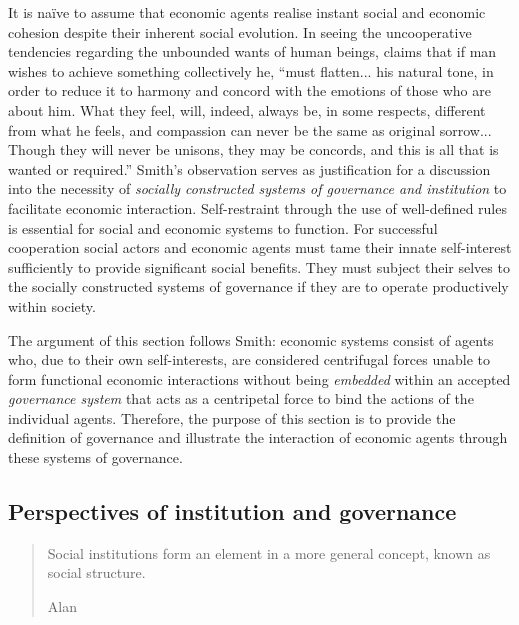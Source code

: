 It is na\"{i}ve to assume that economic agents realise instant social and economic cohesion despite their inherent social evolution. In seeing the uncooperative tendencies regarding the unbounded wants of human beings, \citet[p.~17]{Smith1759} claims that if man wishes to achieve something collectively he, ``must flatten... his natural tone, in order to reduce it to harmony and concord with the emotions of those who are about him. What they feel, will, indeed, always be, in some respects, different from what he feels, and compassion can never be the same as original sorrow... Though they will never be unisons, they may be concords, and this is all that is wanted or required.'' Smith's observation serves as justification for a discussion into the necessity of \emph{socially constructed systems of governance and institution} to facilitate economic interaction. Self-restraint through the use of well-defined rules is essential for social and economic systems to function. For successful cooperation social actors and economic agents must tame their innate self-interest sufficiently to provide significant social benefits. They must subject their selves to the socially constructed systems of governance if they are to operate productively within society.

The argument of this section follows Smith: economic systems consist of agents who, due to their own self-interests, are considered centrifugal forces unable to form functional economic interactions without being \emph{embedded} within an accepted \emph{governance system} that acts as a centripetal force to bind the actions of the individual agents. Therefore, the purpose of this section is to provide the definition of governance and illustrate the interaction of economic agents through these systems of governance.

\subsection{Perspectives of institution and governance}

\begin{quote}
Social institutions form an element in a more general concept, known as social structure.

\begin{flushright}
Alan \citet[p.~3]{Wells1970}
\end{flushright}
\end{quote}

